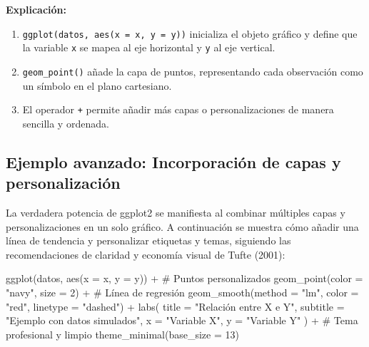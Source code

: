 \documentclass[
  spanish,
  a4paper,
  DIV=11,
  numbers=noendperiod,
  onepage,
  openany]{scrreprt}
\newenvironment{Shaded}{\begin{snugshade}}{\end{snugshade}}
\newcommand{\AttributeTok}[1]{\textcolor[rgb]{0.40,0.45,0.13}{#1}}
\newcommand{\CommentTok}[1]{\textcolor[rgb]{0.37,0.37,0.37}{#1}}
\newcommand{\DecValTok}[1]{\textcolor[rgb]{0.68,0.00,0.00}{#1}}
\newcommand{\FunctionTok}[1]{\textcolor[rgb]{0.28,0.35,0.67}{#1}}
\newcommand{\NormalTok}[1]{\textcolor[rgb]{0.00,0.23,0.31}{#1}}
\newcommand{\SpecialCharTok}[1]{\textcolor[rgb]{0.37,0.37,0.37}{#1}}
\newcommand{\StringTok}[1]{\textcolor[rgb]{0.13,0.47,0.30}{#1}}
\begin{document}
\textbf{Explicación:}

\begin{enumerate}
\def\labelenumi{\arabic{enumi}.}
\item
  \texttt{ggplot(datos,\ aes(x\ =\ x,\ y\ =\ y))} inicializa el objeto
  gráfico y define que la variable \texttt{x} se mapea al eje horizontal
  y \texttt{y} al eje vertical.
\item
  \texttt{geom\_point()} añade la capa de puntos, representando cada
  observación como un símbolo en el plano cartesiano.
\item
  El operador \texttt{+} permite añadir más capas o personalizaciones de
  manera sencilla y ordenada.
\end{enumerate}

\subsection{Ejemplo avanzado: Incorporación de capas y
personalización}\label{ejemplo-avanzado-incorporaciuxf3n-de-capas-y-personalizaciuxf3n}

La verdadera potencia de ggplot2 se manifiesta al combinar múltiples
capas y personalizaciones en un solo gráfico. A continuación se muestra
cómo añadir una línea de tendencia y personalizar etiquetas y temas,
siguiendo las recomendaciones de claridad y economía visual de Tufte
(2001):

\begin{Shaded}
\begin{Highlighting}[]
\FunctionTok{ggplot}\NormalTok{(datos, }\FunctionTok{aes}\NormalTok{(}\AttributeTok{x =}\NormalTok{ x, }\AttributeTok{y =}\NormalTok{ y)) }\SpecialCharTok{+}
  \CommentTok{\# Puntos personalizados}
  \FunctionTok{geom\_point}\NormalTok{(}\AttributeTok{color =} \StringTok{"navy"}\NormalTok{, }\AttributeTok{size =} \DecValTok{2}\NormalTok{) }\SpecialCharTok{+}                
  \CommentTok{\# Línea de regresión}
  \FunctionTok{geom\_smooth}\NormalTok{(}\AttributeTok{method =} \StringTok{"lm"}\NormalTok{, }\AttributeTok{color =} \StringTok{"red"}\NormalTok{, }\AttributeTok{linetype =} \StringTok{"dashed"}\NormalTok{) }\SpecialCharTok{+} 
  \FunctionTok{labs}\NormalTok{(}
    \AttributeTok{title =} \StringTok{"Relación entre X e Y"}\NormalTok{,}
    \AttributeTok{subtitle =} \StringTok{"Ejemplo con datos simulados"}\NormalTok{,}
    \AttributeTok{x =} \StringTok{"Variable X"}\NormalTok{,}
    \AttributeTok{y =} \StringTok{"Variable Y"}
\NormalTok{  ) }\SpecialCharTok{+}
  \CommentTok{\# Tema profesional y limpio}
  \FunctionTok{theme\_minimal}\NormalTok{(}\AttributeTok{base\_size =} \DecValTok{13}\NormalTok{)                        }
\end{Highlighting}
\end{Shaded}
\end{document}
